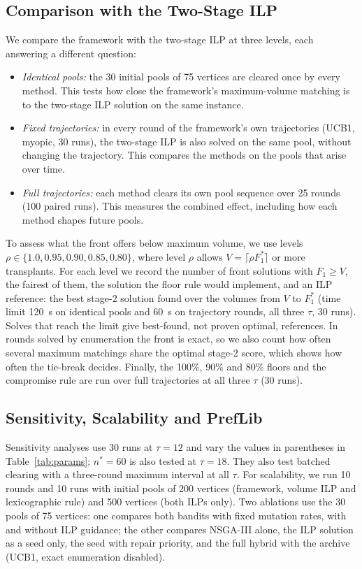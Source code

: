 \documentclass[journal]{IEEEtran}
\begin{document}
\subsection{Comparison with the Two-Stage ILP}
\label{sec:exp:levels}

We compare the framework with the two-stage ILP at three levels, each
answering a different question:
\begin{itemize}
  \item \emph{Identical pools:} the 30 initial pools of 75 vertices are
    cleared once by every method. This tests how close the
    framework's maximum-volume matching is to the two-stage ILP solution on
    the same instance.
  \item \emph{Fixed trajectories:} in every round of the framework's
    own trajectories (UCB1, myopic, 30 runs), the two-stage ILP is also
    solved on the same pool, without changing the trajectory. This
    compares the methods on the pools that arise over time.
  \item \emph{Full trajectories:} each method clears its own pool
    sequence over 25 rounds (100 paired runs). This measures the
    combined effect, including how each method shapes future pools.
\end{itemize}
To assess what the front offers below maximum volume, we use levels
$\rho \in \{1.0, 0.95, 0.90, 0.85, 0.80\}$, where level $\rho$ allows
$V = \lceil \rho F_1^{*} \rceil$ or more transplants. For each level we
record the number of front solutions with $F_1 \geq V$, the fairest of
them, the solution the floor rule would implement, and an
ILP reference: the best stage-2 solution found over the volumes from $V$ to
$F_1^{*}$ (time limit 120~s on identical pools and 60~s on trajectory
rounds, all three $\tau$, 30 runs). Solves that reach the limit give
best-found, not proven optimal, references. In rounds solved by enumeration the
front is exact, so we also count how often several maximum matchings
share the optimal stage-2 score, which shows how often the tie-break
decides. Finally, the 100\%, 90\% and 80\% floors and the compromise
rule are run over full trajectories at all three $\tau$ (30 runs).

\subsection{Sensitivity, Scalability and PrefLib}
\label{sec:exp:ood}

Sensitivity analyses use 30 runs at $\tau = 12$ and vary the values in
parentheses in Table~\ref{tab:params}; $n^* = 60$ is also tested at
$\tau = 18$. They also test batched clearing with a three-round maximum
interval at all $\tau$. For scalability, we run 10 rounds and 10 runs
with initial pools of 200 vertices (framework, volume ILP and
lexicographic rule) and 500 vertices (both ILPs only). Two ablations
use the 30 pools of 75 vertices: one compares both bandits with fixed
mutation rates, with and without ILP guidance; the other compares
NSGA-III alone, the ILP solution as a seed only, the seed with repair
priority, and the full hybrid with the archive (UCB1, exact enumeration
disabled).
\end{document}
